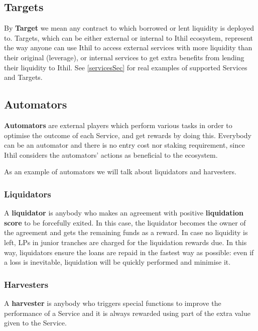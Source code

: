 \documentclass[a4paper,10 pt]{article}
\theoremstyle{definition}
\begin{document}
\subsection{Targets}\label{targetsSub}

By {\bf Target} we mean any contract to which borrowed or lent liquidity is deployed to. Targets, which can be either external or internal to Ithil ecosystem, represent the way anyone can use Ithil to access external services with more liquidity than their original (leverage), or internal services to get extra benefits from lending their liquidity to Ithil. See \ref{servicesSec} for real examples of supported Services and Targets.

\subsection{Automators}\label{automatorsSub}

{\bf Automators} are external players which perform various tasks in order to optimise the outcome of each Service, and get rewards by doing this. Everybody can be an automator and there is no entry cost nor staking requirement, since Ithil considers the automators' actions as beneficial to the ecosystem. 

As an example of automators we will talk about liquidators and harvesters.

\subsubsection{Liquidators}\label{liquidatorSubSub}
A {\bf liquidator} is anybody who makes an agreement with positive {\bf liquidation score} to be forcefully exited. In this case, the liquidator becomes the owner of the agreement and gets the remaining funds as a reward. In case no liquidity is left, LPs in junior tranches are charged for the liquidation rewards due. In this way, liquidators ensure the loans are repaid in the fastest way as possible: even if a loss is inevitable, liquidation will be quickly performed and minimise it.

\subsubsection{Harvesters}\label{harvesterSubSub}
A {\bf harvester} is anybody who triggers special functions to improve the performance of a Service and it is always rewarded using part of the extra value given to the Service. 
\end{document}
